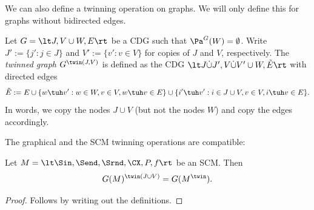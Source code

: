 We can also define a twinning operation on graphs. We will only define this for graphs without bidirected edges.
\begin{Def}\label{def:G_twinning}
  Let $G=\lt J,V \cup W,E\rt$ be a CDG such that $\Pa^G(W) = \emptyset$. Write $J' := \{j' : j \in J\}$
  and $V' := \{v' : v \in V\}$ for copies of $J$ and $V$, respectively.
  The \emph{twinned graph
  $G^{\twin(J,V)}$} is defined as the CDG $\lt J \dot\cup J', V \dot\cup V' \cup W, \tilde{E}\rt$ with directed edges
  $$\tilde{E} := E \cup \{w \tuh v' : w \in W, v \in V, w \tuh v \in E\} \cup \{i' \tuh v' : i \in J \cup V, v \in V, i \tuh v \in E\}.$$
  In words, we copy the nodes $J \cup V$ (but not the nodes $W$) and copy the edges accordingly.
\end{Def}
The graphical and the SCM twinning operations are compatible:
\begin{Prp}\label{prp:compatibility_graph_twinning}
  Let $M = \lt \Sin, \Send, \Srnd, \CX, P, f \rt$ be an SCM. Then
      $$G(M)^{\twin(J\cup V)} = G(M^\twin).$$
\end{Prp}
\begin{proof}
  Follows by writing out the definitions.
\end{proof}


